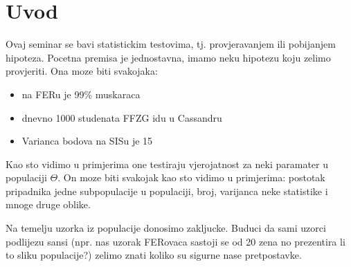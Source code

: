\chapter{Uvod}
\label{Chapter1} %

Ovaj seminar se bavi statistickim testovima, tj. provjeravanjem ili pobijanjem hipoteza. Pocetna premisa je jednostavna, imamo neku hipotezu koju zelimo provjeriti. Ona moze biti svakojaka:

\begin{itemize}
	\item na FERu je 99\% muskaraca 
	\item dnevno 1000 studenata FFZG idu u Cassandru
	\item Varianca bodova na SISu je 15
\end{itemize}

Kao sto vidimo u primjerima one testiraju vjerojatnost za neki paramater u populaciji $\Theta$. On moze biti svakojak kao sto vidimo u primjerima: postotak pripadnika jedne subpopulacije u populaciji, broj, varijanca neke statistike i mnoge druge oblike.

Na temelju uzorka iz populacije donosimo zakljucke. Buduci da sami uzorci podlijezu sansi (npr. nas uzorak FERovaca sastoji se od 20 zena no prezentira li to sliku populacije?) zelimo znati koliko su sigurne nase pretpostavke.